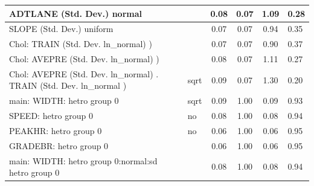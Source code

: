 \begin{table}
\begin{center}
\begin{tabular}{|l|l|c|c|c|l|}
			\hline
			ADTLANE (Std. Dev.) normal &  & 0.08 & 0.07 & 1.09 & 0.28 \\
			\hline
			SLOPE (Std. Dev.) uniform &  & 0.07 & 0.07 & 0.94 & 0.35 \\
			\hline
			 Chol: TRAIN (Std. Dev. ln_normal) ) &  & 0.07 & 0.07 & 0.90 & 0.37 \\
			\hline
			 Chol: AVEPRE (Std. Dev. ln_normal) ) &  & 0.08 & 0.07 & 1.11 & 0.27 \\
			\hline
			 Chol: AVEPRE (Std. Dev. ln_normal) . TRAIN (Std. Dev.   ln_normal ) & sqrt & 0.09 & 0.07 & 1.30 & 0.20 \\
			\hline
			main: WIDTH: hetro group 0 & sqrt & 0.09 & 1.00 & 0.09 & 0.93 \\
			\hline
			SPEED: hetro group 0 & no & 0.08 & 1.00 & 0.08 & 0.94 \\
			\hline
			PEAKHR: hetro group 0 & no & 0.06 & 1.00 & 0.06 & 0.95 \\
			\hline
			GRADEBR: hetro group 0 &  & 0.06 & 1.00 & 0.06 & 0.95 \\
			\hline
			main: WIDTH: hetro group 0:normal:sd  hetro group 0 &  & 0.08 & 1.00 & 0.08 & 0.94 \\
			\hline
		\end{tabular}
	\end{center}
\end{table}